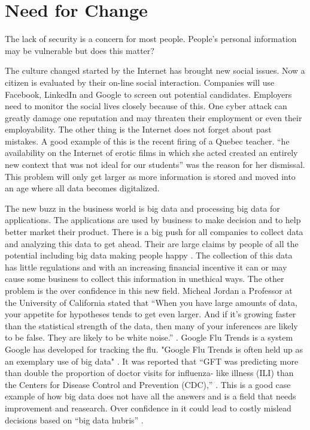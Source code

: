 \documentclass[12pt]{article}
\begin{document}
\section{Need for Change}\label{sec:change}
The lack of security is a concern for most people. People's personal information may be vulnerable but does this matter?

The culture changed started by the Internet has brought new social issues. Now a citizen is evaluated by their on-line social interaction. Companies will use Facebook, LinkedIn and Google to screen out potential candidates. Employers need to monitor the social lives closely because of this. One cyber attack can greatly damage one reputation and may threaten their employment or even their employability. The other thing is the Internet does not forget about past mistakes. A good example of this is the recent firing of a Quebec teacher. ``he availability on the Internet of erotic films in which she acted created an entirely new context that was not ideal for our students'' \cite{Peritz} was the reason for her dismissal. This problem will only get larger as more information is stored and moved into an age where all data becomes digitalized.

The new buzz in the business world is big data and processing big data for applications. The applications are used by business to make decision and to help better market their product. There is a big push for all companies to collect data and analyzing this data to get ahead. Their are large claims by people of all the potential including big data making people happy \cite{Banayan}. The collection of this data has little regulations and with an increasing financial incentive it can or may cause some business to collect this information in unethical ways. The other problem is the over confidence in this new field. Micheal Jordan a Professor at the University of California stated that ``When you have large amounts of data, your appetite for hypotheses tends to get even larger. And if it’s growing faster than the statistical strength of the data, then many of your inferences are likely to be false. They are likely to be white noise.'' \cite{Gomes}. Google Flu Trends is a system Google has developed for tracking the flu. "Google Flu Trends is often held 
up as an exemplary use of big data" \cite{Lazer}. It was reported that ``GFT was predicting more than double the proportion of doctor visits for influenza- like illness (ILI) than the Centers for Disease Control and Prevention (CDC),'' \cite{Lazer}. This is a good case example of how big data does not have all the answers and is a field that needs improvement and reasearch. Over confidence in it could lead to costly mislead decisions based on ``big data hubris'' \cite{Lazer}.
\end{document}
